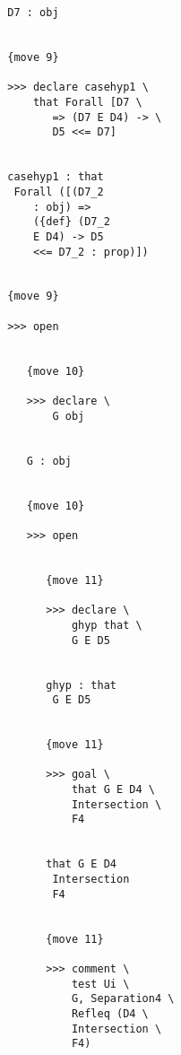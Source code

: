 \documentclass[12pt]{article}
\begin{document}
\begin{verbatim}
                           D7 : obj


                           {move 9}

                           >>> declare casehyp1 \
                               that Forall [D7 \
                                  => (D7 E D4) -> \
                                  D5 <<= D7]


                           casehyp1 : that 
                            Forall ([(D7_2 
                               : obj) => 
                               ({def} (D7_2 
                               E D4) -> D5 
                               <<= D7_2 : prop)])


                           {move 9}

                           >>> open


                              {move 10}

                              >>> declare \
                                  G obj


                              G : obj


                              {move 10}

                              >>> open


                                 {move 11}

                                 >>> declare \
                                     ghyp that \
                                     G E D5


                                 ghyp : that 
                                  G E D5


                                 {move 11}

                                 >>> goal \
                                     that G E D4 \
                                     Intersection \
                                     F4


                                 that G E D4 
                                  Intersection 
                                  F4


                                 {move 11}

                                 >>> comment \
                                     test Ui \
                                     G, Separation4 \
                                     Refleq (D4 \
                                     Intersection \
                                     F4)



\end{verbatim}
\end{document}
